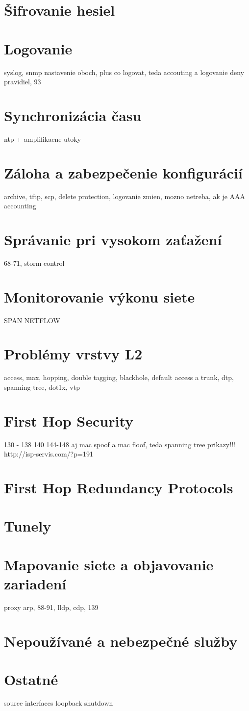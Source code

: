 \section{Šifrovanie hesiel}

\section{Logovanie}
syslog, snmp nastavenie oboch, plus co logovat, teda accouting a logovanie deny pravidiel, 93

\section{Synchronizácia času}
ntp + amplifikacne utoky

\section{Záloha a zabezpečenie konfigurácií}
archive, tftp, scp, delete protection, logovanie zmien, mozno netreba, ak je AAA accounting
\section{Správanie pri vysokom zaťažení}
68-71, storm control
\section{Monitorovanie výkonu siete}
SPAN NETFLOW
\section{Problémy vrstvy L2}
access, max, hopping, double tagging, blackhole, default access a trunk, dtp, spanning tree, dot1x, vtp
\section{First Hop Security}
130 - 138 140 144-148 aj mac spoof a mac floof, teda spanning tree prikazy!!!
http://isp-servis.com/?p=191
\section{First Hop Redundancy Protocols}

\section{Tunely}
\section{Mapovanie siete a objavovanie zariadení}
proxy arp, 88-91, lldp, cdp, 139
\section{Nepoužívané a nebezpečné služby}
\section{Ostatné}
source interfaces
loopback
shutdown 
